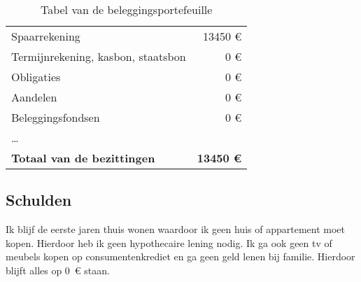 \begin{table}[ht]
\begin{minipage}[b]{9cm}
\begin{tabular}{@{}lr@{}}
			Spaarrekening                      &           13450 \euro{} \\
			Termijnrekening, kasbon, staatsbon &           0 \euro{} \\
			Obligaties                         &           0 \euro{} \\
			Aandelen                           &           0 \euro{} \\
			Beleggingsfondsen                  &           0 \euro{} \\
			\dots                              &  \\ \toprule
			\textbf{Totaal van de bezittingen} & \textbf{13450 \euro{}} \\ \bottomrule
		\end{tabular}
		\caption{Tabel van de beleggingsportefeuille}
		\label{tab:tabelbeleggingsportefeuille}
	\end{minipage}
\end{table}
%
%



\newpage
\subsection{Schulden}


Ik blijf de eerste jaren thuis wonen waardoor ik geen huis of appartement moet kopen. Hierdoor heb ik geen hypothecaire lening nodig. Ik ga ook geen tv of meubels kopen op consumentenkrediet en ga geen geld lenen bij familie. Hierdoor blijft alles op 0~\euro{} staan.

%

